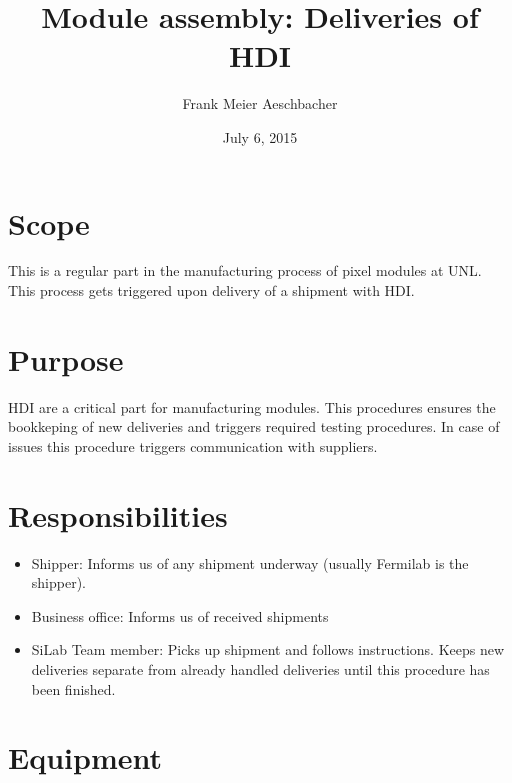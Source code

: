 \documentclass[12pt]{unlsilabsop}
\title{Module assembly: Deliveries of HDI}
\date{July 6, 2015}
\author{Frank Meier Aeschbacher}
\begin{document}
\maketitle

\section{Scope}
This is a regular part in the manufacturing process of pixel modules at UNL. This process gets triggered upon delivery of a shipment with HDI.

\section{Purpose}
HDI are a critical part for manufacturing modules. This procedures ensures the bookkeping of new deliveries and triggers required testing procedures. In case of issues this procedure triggers communication with suppliers.


\section{Responsibilities}

\begin{itemize}
    \item Shipper: Informs us of any shipment underway (usually Fermilab is the shipper).
    \item Business office: Informs us of received shipments
    \item SiLab Team member: Picks up shipment and follows instructions. Keeps new deliveries separate from already handled deliveries until this procedure has been finished.
\end{itemize}

\section{Equipment}
\end{document}
